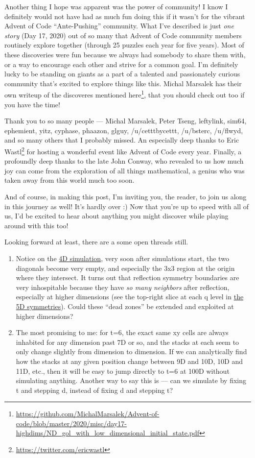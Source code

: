 \documentclass[]{article}
\renewcommand{\href}[2]{#2\footnote{\url{#1}}}
\begin{document}
Another thing I hope was apparent was the power of community! I know I
definitely would not have had as much fun doing this if it wasn't for the
vibrant Advent of Code ``Ante-Pushing'' community. What I've described is just
\emph{one story} (Day 17, 2020) out of so many that Advent of Code community
members routinely explore together (through 25 puzzles each year for five
years). Most of these discoveries were fun because we always had somebody to
share them with, or a way to encourage each other and strive for a common goal.
I'm definitely lucky to be standing on giants as a part of a talented and
passionately curious community that's excited to explore things like this.
Michal Marsalek
\href{https://github.com/MichalMarsalek/Advent-of-code/blob/master/2020/misc/day17-highdims/ND_gol_with_low_dimensional_initial_state.pdf}{has
their own writeup of the discoveres mentioned here}, that you should check out
too if you have the time!

Thank you to so many people --- Michal Marsalek, Peter Tseng, leftylink, sim64,
ephemient, yitz, cyphase, phaazon, glguy, /u/cetttbycettt, /u/bsterc, /u/flwyd,
and so many others that I probably missed. An especially deep thanks to
\href{https://twitter.com/ericwastl}{Eric Wastl} for hosting a wonderful event
like Advent of Code every year. Finally, a profoundly deep thanks to the late
John Conway, who revealed to us how much joy can come from the exploration of
all things mathematical, a genius who was taken away from this world much too
soon.

And of course, in making this post, I'm inviting you, the reader, to join us
along in this journey as well! It's hardly over :) Now that you're up to speed
with all of us, I'd be excited to hear about anything you might discover while
playing around with this too!

Looking forward at least, there are a some open threads still.

\begin{enumerate}
\def\labelenumi{\arabic{enumi}.}
\tightlist
\item
  Notice on the \protect\hyperlink{gol4D}{4D simulation}, very soon after
  simulations start, the two diagonals become very empty, and especially the 3x3
  region at the origin where they intersect. It turns out that reflection
  symmetry boundaries are very inhospitable because they have \emph{so many
  neighbors} after reflection, especially at higher dimensions (see the
  top-right slice at each q level in \protect\hyperlink{golSyms5D}{the 5D
  symmetries}). Could these ``dead zones'' be extended and exploited at higher
  dimensions?
\item
  The most promising to me: for t=6, the exact same xy cells are always
  inhabited for any dimension past 7D or so, and the stacks at each seem to only
  change slightly from dimension to dimension. If we can analytically find how
  the stacks at any given position change between 9D and 10D, 10D and 11D, etc.,
  then it will be easy to jump directly to t=6 at 100D without simulating
  anything. Another way to say this is --- can we simulate by fixing t and
  stepping d, instead of fixing d and stepping t?
\end{enumerate}
\end{document}
